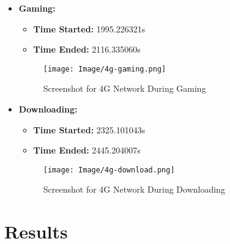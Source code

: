 \documentclass[conference]{IEEEtran}
\begin{document}
\begin{itemize}
    \item \textbf{Gaming:}
    \begin{itemize}
        \item \textbf{Time Started:} 1995.226321s
        \item \textbf{Time Ended:} 2116.335060s
    \end{itemize}
    \begin{figure}[h]
        \centering
        \texttt{[image: Image/4g-gaming.png]}
        \caption{Screenshot for 4G Network During Gaming}
        \label{fig:4g_gaming}
    \end{figure}

    \item \textbf{Downloading:}
    \begin{itemize}
        \item \textbf{Time Started:} 2325.101043s
        \item \textbf{Time Ended:} 2445.204007s
    \end{itemize}
    \begin{figure}[h]
        \centering
        \texttt{[image: Image/4g-download.png]}
        \caption{Screenshot for 4G Network During Downloading}
        \label{fig:4g_downloading}
    \end{figure}
\end{itemize}




\section{Results}
\end{document}
